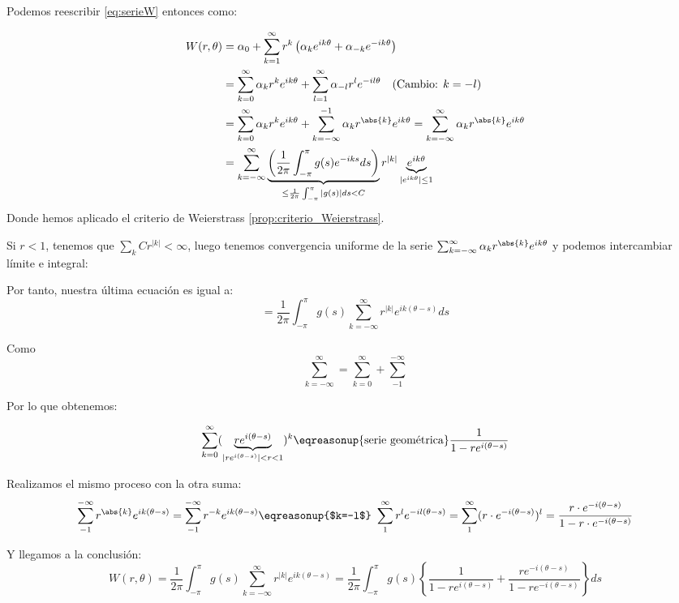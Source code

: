 		Podemos reescribir \eqref{eq:serieW} entonces como:

		\begin{align*}
		W(r, \theta) &= \alpha_0 + \sum_{k=1}^{\infty} r^k \left( \alpha_k e^{ik\theta} + \alpha_{-k} e^{-ik\theta} \right)\\
%
		&= \sum_{k=0}^{\infty} \alpha_k r^k e^{ik\theta} + \sum_{l=1}^{\infty} \alpha_{-l} r^l e^{-il\theta} \quad (\text{Cambio: } k = -l)\\
%
		&= \sum_{k=0}^{\infty} \alpha_k r^k e^{ik\theta} + \sum_{k=-\infty}^{-1} \alpha_{k} r^{\abs{k}} e^{ik\theta} = \sum_{k=-\infty}^{\infty} \alpha_{k} r^{\abs{k}} e^{ik\theta}\\
%
		&= \sum_{k=-\infty}^{\infty} \underbrace{\left( \frac{1}{2\pi} \int_{-\pi}^{\pi} g(s) e^{-iks} ds \right)}_{\leq \frac{1}{2\pi} \int_{-\pi}^{\pi} |g(s)| ds < C} r ^{|k|} \underbrace{e^{ik\theta}}_{|e^{ik\theta}| \leq 1}\\
		\end{align*}
		Donde hemos aplicado el criterio de Weierstrass \ref{prop:criterio_Weierstrass}.

		Si $r < 1$, tenemos que $\sum_k Cr^{|k|} < \infty$, luego tenemos convergencia uniforme de la serie $\sum_{k=-\infty}^{\infty} \alpha_{k} r^{\abs{k}} e^{ik\theta}$ y podemos intercambiar límite e integral:

		Por tanto, nuestra última ecuación es igual a:
		\[ = \frac{1}{2\pi} \int_{-\pi}^{\pi} g(s) \sum_{k=-\infty}^{\infty} r^{|k|} e^{ik(\theta-s)} ds \]

		Como $$\sum\limits_{k=-\infty}^{\infty} = \sum\limits_{k=0}^{\infty} + \sum\limits_{-1}^{-\infty}$$

		Por lo que obtenemos:

		\[
		\sum_{k=0}^{\infty} (\underbrace{r e^{i (\theta-s)}}_{|re^{i(\theta-s)}| < r < 1})^k \eqreasonup{\text{serie geométrica}} \frac{1}{1-re^{i(\theta-s)}}
		\]

		Realizamos el mismo proceso con la otra suma:
		\begin{gather*}
			\sum\limits_{-1}^{-\infty} r^{\abs{k}} e^{ik(\theta-s)} = \sum\limits_{-1}^{-\infty} r^{-k} e^{ik(\theta-s)} \eqreasonup{$k=-l$} \ \sum\limits_{1}^{\infty} r^{l} e^{-il(\theta-s)} = \sum\limits_{1}^{\infty} (r \cdot e^{-i(\theta-s)})^l = \frac{r \cdot e^{-i(\theta-s)}}{1-r \cdot e^{-i(\theta-s)}}
		\end{gather*}

		Y llegamos a la conclusión:
		\[
		W(r,\theta) = \frac{1}{2\pi} \int_{-\pi}^\pi g(s) \sum_{k=-\infty}^\infty r^{|k|} e^{ik(\theta-s)} = \frac{1}{2\pi} \int_{-\pi}^\pi g(s) \left\{ \frac{1}{1-re^{i(\theta-s)}} + \frac{re^{-i(\theta-s)}}{1-re^{-i(\theta-s)}} \right\} ds	\]

